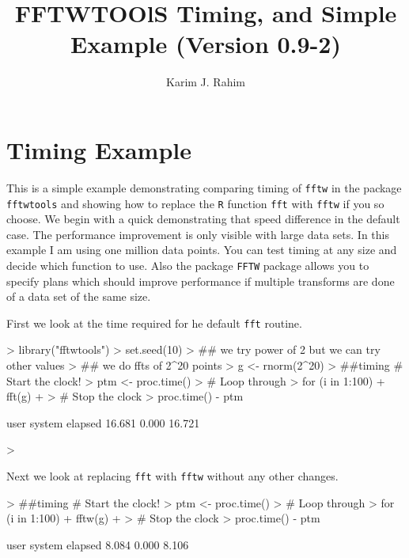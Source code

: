 \documentclass{article}
\begin{document}
\title{FFTWTOOlS Timing, and Simple Example (Version 0.9-2)} 
\author{Karim J. Rahim}
\maketitle

\section{Timing Example}

This is a simple example demonstrating comparing timing of \texttt{fftw} in the package \texttt{fftwtools} and showing how
to replace the \texttt{R} function \texttt{fft} with \texttt{fftw} if you so choose.  We begin with a quick demonstrating that speed difference in the default case. The performance improvement is only visible with large data sets. In this example I am using one million data points. You can test timing at any size and decide which function to use. Also the package \texttt{FFTW} package allows you to specify plans which should improve performance if multiple transforms are done of a data set of the same size.

First we look at the time required for he default \texttt{fft} routine.
\begin{Schunk}
\begin{Sinput}
> library("fftwtools")
> set.seed(10)
> ## we try power of 2 but we can try other values
> ## we do ffts of 2^20 points
> g <- rnorm(2^20)
> ##timing # Start the clock!
> ptm <- proc.time()
> # Loop through 
> for (i in 1:100){
+     fft(g)
+ }
> # Stop the clock
> proc.time() - ptm
\end{Sinput}
\begin{Soutput}
   user  system elapsed 
 16.681   0.000  16.721 
\end{Soutput}
\begin{Sinput}
> 
\end{Sinput}
\end{Schunk}

Next we look at replacing \texttt{fft} with \texttt{fftw} without any other changes.

\begin{Schunk}
\begin{Sinput}
> ##timing # Start the clock!
> ptm <- proc.time()
> # Loop through 
> for (i in 1:100){
+     fftw(g)
+ }
> # Stop the clock
> proc.time() - ptm
\end{Sinput}
\begin{Soutput}
   user  system elapsed 
  8.084   0.000   8.106 
\end{Soutput}
\end{Schunk}
\end{document}

